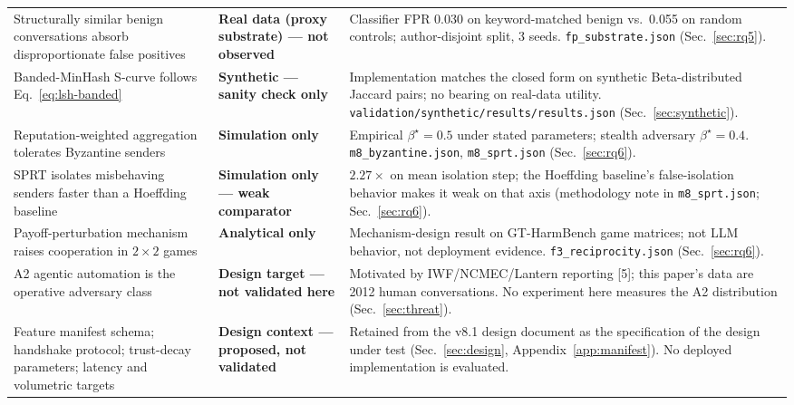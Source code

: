 \documentclass[11pt]{article}
\begin{document}
{\begin{longtable}{@{}p{4.6cm} p{3.1cm} p{6.8cm}@{}}
Structurally similar benign conversations absorb disproportionate false positives & \textbf{Real data (proxy substrate) --- not observed} & Classifier FPR 0.030 on keyword-matched benign vs.\ 0.055 on random controls; author-disjoint split, 3 seeds. \texttt{fp\_substrate.json} (Sec.~\ref{sec:rq5}). \\

Banded-MinHash S-curve follows Eq.~\eqref{eq:lsh-banded} & \textbf{Synthetic --- sanity check only} & Implementation matches the closed form on synthetic Beta-distributed Jaccard pairs; no bearing on real-data utility. \texttt{validation/synthetic/results/results.json} (Sec.~\ref{sec:synthetic}). \\

Reputation-weighted aggregation tolerates Byzantine senders & \textbf{Simulation only} & Empirical $\beta^\star = 0.5$ under stated parameters; stealth adversary $\beta^\star = 0.4$. \texttt{m8\_byzantine.json}, \texttt{m8\_sprt.json} (Sec.~\ref{sec:rq6}). \\

SPRT isolates misbehaving senders faster than a Hoeffding baseline & \textbf{Simulation only --- weak comparator} & $2.27\times$ on mean isolation step; the Hoeffding baseline's false-isolation behavior makes it weak on that axis (methodology note in \texttt{m8\_sprt.json}; Sec.~\ref{sec:rq6}). \\

Payoff-perturbation mechanism raises cooperation in $2\times2$ games & \textbf{Analytical only} & Mechanism-design result on GT-HarmBench game matrices; not LLM behavior, not deployment evidence. \texttt{f3\_reciprocity.json} (Sec.~\ref{sec:rq6}). \\

A2 agentic automation is the operative adversary class & \textbf{Design target --- not validated here} & Motivated by IWF/NCMEC/Lantern reporting [5]; this paper's data are 2012 human conversations. No experiment here measures the A2 distribution (Sec.~\ref{sec:threat}). \\

Feature manifest schema; handshake protocol; trust-decay parameters; latency and volumetric targets & \textbf{Design context --- proposed, not validated} & Retained from the v8.1 design document as the specification of the design under test (Sec.~\ref{sec:design}, Appendix~\ref{app:manifest}). No deployed implementation is evaluated. \\

\end{longtable}
}
\end{document}
